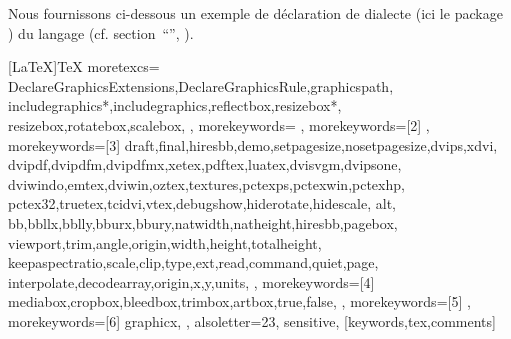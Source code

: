 \documentclass{letgut}
\begin{document}
Nous fournissons ci-dessous un exemple de déclaration de dialecte (ici le
package  ) du langage 
(cf. section~\enquote{}, ).

\begin{ltx-code}[listing options app={deletekeywords={[3]{
  ,draft
  ,final
  ,setpagesize
  ,dvips
  ,dvipdfm
  ,dvipdfmx
  ,xetex
  ,pdftex
  ,dvipsone
  ,dviwindo
  ,textures
  ,vtex
  ,alt
  ,width
  ,height
  ,totalheight
  ,scale
  ,clip
  ,draft
  ,type
  ,command
  ,page
}}},
listing options app={deletekeywords={[4]{
  ,draft
  ,final
  ,dvips
  ,dvipdfm
  ,dvipdfmx
  ,xetex
  ,pdftex
  ,luatex
  ,vtex
  ,scale
  ,true
  ,false
}}}]
[LaTeX]{TeX}{%
  moretexcs={%
    DeclareGraphicsExtensions,DeclareGraphicsRule,graphicspath,%
    includegraphics*,includegraphics,reflectbox,resizebox*,%
    resizebox,rotatebox,scalebox,%
  },%
  morekeywords={%
  },%
  morekeywords=[2]{%
  },%
  morekeywords=[3]{%
    draft,final,hiresbb,demo,setpagesize,nosetpagesize,dvips,xdvi,%
    dvipdf,dvipdfm,dvipdfmx,xetex,pdftex,luatex,dvisvgm,dvipsone,%
    dviwindo,emtex,dviwin,oztex,textures,pctexps,pctexwin,pctexhp,%
    pctex32,truetex,tcidvi,vtex,debugshow,hiderotate,hidescale,%
    alt,%
    bb,bbllx,bblly,bburx,bbury,natwidth,natheight,hiresbb,pagebox,%
    viewport,trim,angle,origin,width,height,totalheight,%
    keepaspectratio,scale,clip,type,ext,read,command,quiet,page,%
    interpolate,decodearray,origin,x,y,units,%
  },%
  morekeywords=[4]{%
    mediabox,cropbox,bleedbox,trimbox,artbox,true,false,%
  },%
  morekeywords=[5]{%
  },%
  morekeywords=[6]{%
    graphicx,%
  },%
  alsoletter={23},%
  sensitive,%
}[keywords,tex,comments]%
\end{ltx-code}

\printacronyms[
, heading=title
, preamble={\label{liste-acronymes}}
, display=all
, exclude=thisdocument
, name={Liste des acronymes prédéfinis par \letgut}
]
\end{document}
